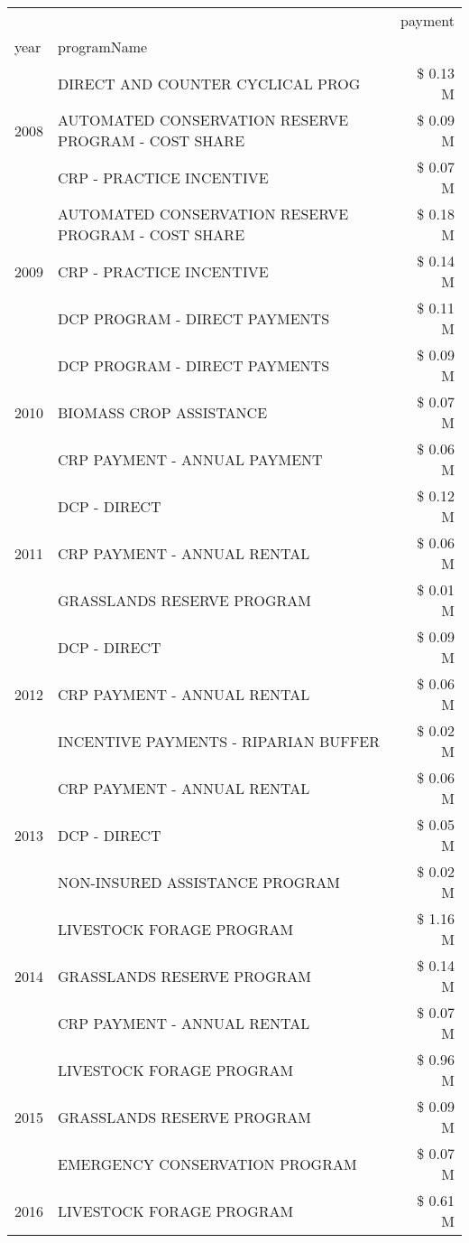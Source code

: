 \begin{tabular}{llr}
\toprule
 &  & payment \\
year & programName &  \\
\midrule
\multirow[t]{3}{*}{2008} & DIRECT AND COUNTER CYCLICAL PROG & \$ 0.13 M \\
 & AUTOMATED CONSERVATION RESERVE PROGRAM - COST SHARE & \$ 0.09 M \\
 & CRP - PRACTICE INCENTIVE & \$ 0.07 M \\
\cline{1-3}
\multirow[t]{3}{*}{2009} & AUTOMATED CONSERVATION RESERVE PROGRAM - COST SHARE & \$ 0.18 M \\
 & CRP - PRACTICE INCENTIVE & \$ 0.14 M \\
 & DCP PROGRAM - DIRECT PAYMENTS & \$ 0.11 M \\
\cline{1-3}
\multirow[t]{3}{*}{2010} & DCP PROGRAM - DIRECT PAYMENTS & \$ 0.09 M \\
 & BIOMASS CROP ASSISTANCE & \$ 0.07 M \\
 & CRP PAYMENT - ANNUAL PAYMENT & \$ 0.06 M \\
\cline{1-3}
\multirow[t]{3}{*}{2011} & DCP - DIRECT & \$ 0.12 M \\
 & CRP PAYMENT - ANNUAL RENTAL & \$ 0.06 M \\
 & GRASSLANDS RESERVE PROGRAM & \$ 0.01 M \\
\cline{1-3}
\multirow[t]{3}{*}{2012} & DCP - DIRECT & \$ 0.09 M \\
 & CRP PAYMENT - ANNUAL RENTAL & \$ 0.06 M \\
 & INCENTIVE PAYMENTS - RIPARIAN BUFFER & \$ 0.02 M \\
\cline{1-3}
\multirow[t]{3}{*}{2013} & CRP PAYMENT - ANNUAL RENTAL & \$ 0.06 M \\
 & DCP - DIRECT & \$ 0.05 M \\
 & NON-INSURED ASSISTANCE PROGRAM & \$ 0.02 M \\
\cline{1-3}
\multirow[t]{3}{*}{2014} & LIVESTOCK FORAGE PROGRAM & \$ 1.16 M \\
 & GRASSLANDS RESERVE PROGRAM & \$ 0.14 M \\
 & CRP PAYMENT - ANNUAL RENTAL & \$ 0.07 M \\
\cline{1-3}
\multirow[t]{3}{*}{2015} & LIVESTOCK FORAGE PROGRAM & \$ 0.96 M \\
 & GRASSLANDS RESERVE PROGRAM & \$ 0.09 M \\
 & EMERGENCY CONSERVATION PROGRAM & \$ 0.07 M \\
\cline{1-3}
\multirow[t]{3}{*}{2016} & LIVESTOCK FORAGE PROGRAM & \$ 0.61 M \\

\end{tabular}

